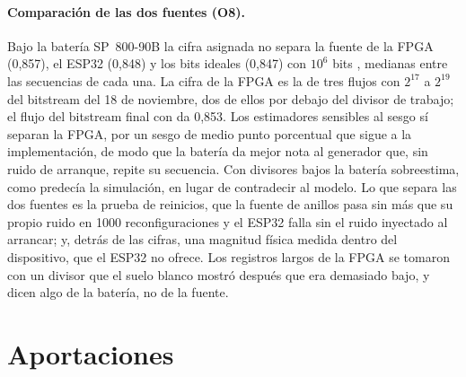 \paragraph{Comparación de las dos fuentes (O8).} Bajo la batería
SP~800-90B la cifra asignada no separa la fuente de la \ac{FPGA} (0,857),
el ESP32 (0,848) y los bits ideales (0,847) con $10^6$ bits \meas{},
medianas entre las secuencias de cada una. La cifra de la \ac{FPGA} es
la de tres flujos con $2^{17}$ a $2^{19}$ del bitstream del 18 de
noviembre, dos de ellos por debajo del divisor de trabajo; el flujo del
bitstream final con  da 0,853. Los
estimadores sensibles al sesgo sí separan la \ac{FPGA}, por un sesgo de
medio punto porcentual que sigue a la implementación, de modo que la
batería da mejor nota al generador que, sin ruido de arranque, repite su
secuencia. Con divisores bajos la batería sobreestima, como predecía la
simulación, en lugar de contradecir al modelo. Lo que separa las dos
fuentes es la prueba de reinicios, que la fuente de anillos pasa sin más
que su propio ruido en 1000 reconfiguraciones y el ESP32 falla sin el
ruido inyectado al arrancar; y, detrás de las cifras, una magnitud física
medida dentro del dispositivo, que el ESP32 no ofrece. Los registros
largos de la \ac{FPGA} se tomaron con un divisor que el suelo blanco
mostró después que era demasiado bajo, y dicen algo de la batería, no de
la fuente.

\section{Aportaciones}

